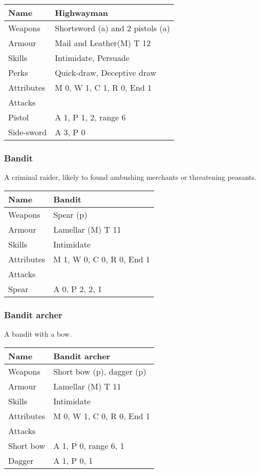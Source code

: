 \documentclass[a4paper,11pt,oneside]{book}
\newcommand{\textlf}[1]{\textbf{\titlecap{#1}}}
\begin{document}
\begin{tabular}{|l|l|}
	\hline
	Name & Highwayman\\
	\hline
	Weapons & Shortsword (a) and 2 pistols (a)\\
	Armour & Mail and Leather(M) T 12\\
	Skills & Intimidate, Persuade\\
	Perks & Quick-draw, Deceptive draw \\
	Attributes & M 0, W 1, C 1, R 0, End 1\\ 
	\hline
	Attacks & \\
	\hline
	Pistol & A 1, P 1, \textlf{penetration} 2, range 6\\
	Side-sword & A 3, P 0 \\
	\hline
\end{tabular}

\subsubsection{Bandit}
A criminal raider, likely to found ambushing merchants or threatening peasants.

\begin{tabular}{|l|l|}
	\hline
	Name & Bandit\\
	\hline
	Weapons & Spear (p)\\
	Armour & Lamellar (M) T 11\\
	Skills & Intimidate\\
	Attributes & M 1, W 0, C 0, R 0, End 1\\ 
	\hline
	Attacks & \\
	\hline
	Spear & A 0, P 2, \textlf{Rending} 2, \textlf{Reach} 1 \\
	\hline
\end{tabular}

\subsubsection{Bandit archer}
A bandit with a bow.

\begin{tabular}{|l|l|}
	\hline
	Name & Bandit archer\\
	\hline
	Weapons & Short bow (p), dagger (p)\\
	Armour & Lamellar (M) T 11\\
	Skills & Intimidate\\
	Attributes & M 0, W 1, C 0, R 0, End 1\\ 
	\hline
	Attacks & \\
	\hline
	Short bow & A 1, P 0, range 6, \textlf{rending} 1 \\
	Dagger & A 1, P 0, \textlf{Rending} 1 \\
	\hline
\end{tabular}
\end{document}
